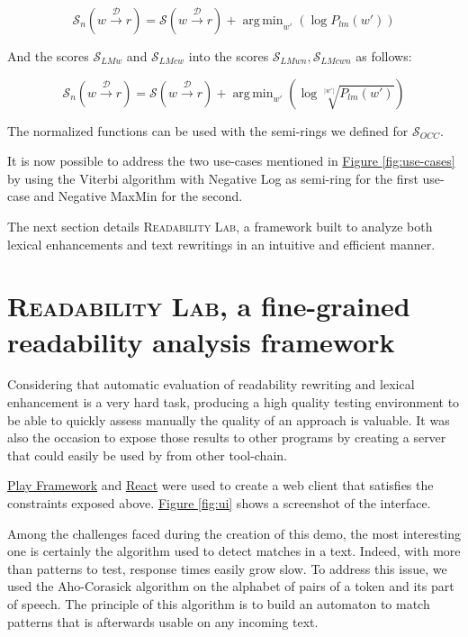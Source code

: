 \documentclass[a4paper, 11pt, onepage]{scrreprt}
\newcommand\figureref[1]{\hyperref[#1]{Figure \ref*{#1}}}
\newcommand\maps[1]{\xrightarrow{\mathcal{#1}}}
\newcommand\card[1]{\lvert #1 \rvert}
\newcommand\proba[2][]{P_{#1} \left( #2 \right)}
\DeclareMathOperator*{\argmin}{\arg\,\min}
\begin{document}
\[
\mathcal{S}_{n} \left( w \maps{D} r \right) = \mathcal{S} \left( w
  \maps{D} r \right) + \argmin_{w'} \left( \log \proba[lm]{w'} \right)
\]

And the scores $\mathcal{S}_{LMw}$ and $\mathcal{S}_{LMcw}$ into the
scores $\mathcal{S}_{LMwn}, \mathcal{S}_{LMcwn}$ as follows:

\[
\mathcal{S}_{n} \left( w \maps{D} r \right) = \mathcal{S} \left( w
  \maps{D} r \right) + \argmin_{w'} \left( \log
  \sqrt[\card{w'}]{\proba[lm]{w'}} \right)
\]

The normalized functions can be used with the semi-rings we defined
for $\mathcal{S}_{OCC}$.

It is now possible to address the two use-cases mentioned in
\figureref{fig:use-cases} by using the Viterbi algorithm
\cite{forney1973viterbi} with Negative Log as semi-ring for the first
use-case and Negative MaxMin for the second.

The next section details \textsc{Readability Lab}, a framework built
to analyze both lexical enhancements and text rewritings in an
intuitive and efficient manner.

\section{\textsc{Readability Lab}, a fine-grained readability analysis
  framework}
\label{sec:framework}

Considering that automatic evaluation of readability rewriting and
lexical enhancement is a very hard task, producing a high quality
testing environment to be able to quickly assess manually the quality
of an approach is valuable. It was also the occasion to expose those
results to other programs by creating a server that could easily be
used by from other tool-chain.

\href{http://www.playframework.com/}{Play Framework} and
\href{https://facebook.github.io/react/}{React} were used to create a
web client that satisfies the constraints exposed
above. \figureref{fig:ui} shows a screenshot of the interface.

Among the challenges faced during the creation of this demo, the most
interesting one is certainly the algorithm used to detect matches in a
text. Indeed, with more than  patterns to test,
response times easily grow slow. To address this issue, we used the
Aho-Corasick algorithm \cite{aho1975efficient} on the alphabet of
pairs of a token and its part of speech. The principle of this
algorithm is to build an automaton to match patterns that is
afterwards usable on any incoming text.
\end{document}
